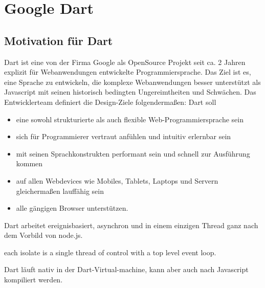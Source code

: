 \section{Google Dart}\label{s.Google Dart }

\subsection{Motivation für Dart}
Dart ist eine von der Firma Google als OpenSource Projekt seit ca. 2 Jahren explizit für Webanwendungen entwickelte Programmiersprache. Das Ziel ist es, eine Sprache zu entwickeln, die komplexe Webanwendungen besser unterstützt als Javascript mit seinen historisch bedingten Ungereimtheiten und Schwächen.
Das Entwicklerteam definiert die Design-Ziele folgendermaßen:
Dart soll
\begin{itemize}   
\item eine sowohl strukturierte als auch flexible Web-Programmiersprache sein
\item sich für Programmierer vertraut anfühlen und intuitiv erlernbar sein 
\item mit seinen Sprachkonstrukten performant sein und schnell zur Ausführung kommen
\item auf allen Webdevices wie Mobiles, Tablets, Laptops und Servern gleichermaßen lauffähig sein
\item alle gängigen Browser unterstützen.
\end{itemize}

Dart arbeitet ereignisbasiert, asynchron und in einem einzigen Thread ganz nach dem Vorbild von node.js. 

each isolate is a single thread of control with a top level event loop.


 Dart läuft nativ in der Dart-Virtual-machine, kann aber auch nach Javascript kompiliert werden.
 

 
